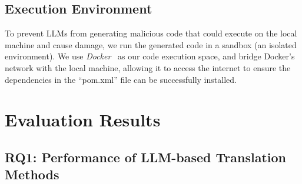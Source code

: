\vspace{-10pt}
\subsection{Execution Environment}  
To prevent LLMs from generating malicious code that could execute on the local machine and cause damage, we run the generated code in a sandbox (an isolated environment). 
We use \textit{Docker}~\cite{docker} as our code execution space, and bridge Docker's network with the local machine, allowing it to access the internet to ensure the dependencies in the ``pom.xml'' file can be successfully installed.



\section{Evaluation Results}
\label{sec:EvaluationResults}
\subsection{RQ1: Performance of LLM-based Translation Methods}
\label{sec:PerformanceOfTranslation}




